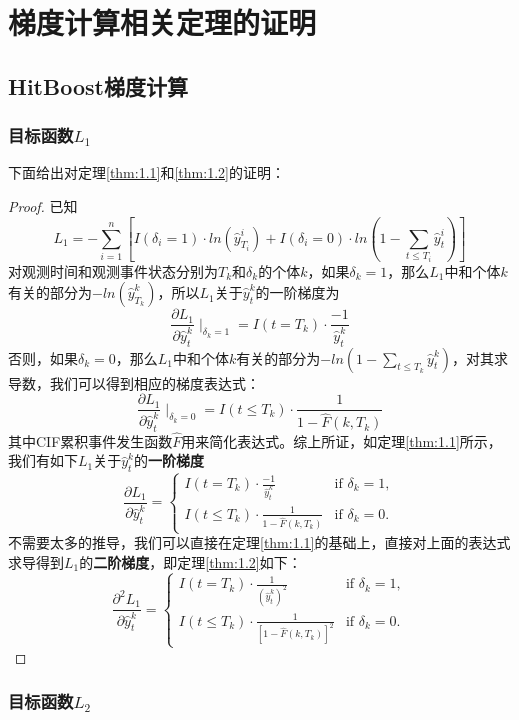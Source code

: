 
\thesisappendix

\chapter{梯度计算相关定理的证明}

\section{HitBoost梯度计算}

\subsection{目标函数$L_1$}

下面给出对定理\ref{thm:1.1}和\ref{thm:1.2}的证明：
\begin{proof}
已知$$L_1 = -\sum_{i=1}^{n} \left[ I(\delta_i=1)\cdot ln(\hat{y}_{T_i}^i) + I(\delta_i=0)\cdot ln(1-\sum_{t\le T_i}\hat{y}_t^i) \right]$$ 对观测时间和观测事件状态分别为$T_k$和$\delta_k$的个体$k$，如果$\delta_k = 1$，那么$L_1$中和个体$k$有关的部分为$-ln(\hat{y}_{T_k}^k)$，所以$L_1$关于$\hat{y}_t^k$的一阶梯度为$$\frac{\partial L_1}{\partial \hat{y}_t^k} \mid_{\delta_k = 1} = I(t=T_k)\cdot \frac{-1}{\hat{y}_t^k}$$ 否则，如果$\delta_k = 0$，那么$L_1$中和个体$k$有关的部分为$-ln(1-\sum_{t\le T_k}\hat{y}_t^k)$，对其求导数，我们可以得到相应的梯度表达式：$$\frac{\partial L_1}{\partial \hat{y}_t^k} \mid_{\delta_k = 0} = I(t\le T_k)\cdot \frac{1}{1-\hat{F}(k, T_k)}$$ 其中CIF累积事件发生函数$\hat{F}$用来简化表达式。综上所证，如定理\ref{thm:1.1}所示，我们有如下$L_1$关于$\hat{y}_t^k$的\textbf{一阶梯度}$$
\frac{\partial L_1}{\partial \hat{y}_t^k}=
\begin{cases}
  I(t=T_k)\cdot \frac{-1}{\hat{y}_t^k} & \text{if } \delta_k = 1,\\
  I(t\le T_k)\cdot \frac{1}{1-\hat{F}(k, T_k)} & \text{if } \delta_k = 0.
\end{cases}
$$ 不需要太多的推导，我们可以直接在定理\ref{thm:1.1}的基础上，直接对上面的表达式求导得到$L_1$的\textbf{二阶梯度}，即定理\ref{thm:1.2}如下：$$
\frac{\partial^2 L_1}{\partial \hat{y}_t^k}=
\begin{cases}
  I(t=T_k)\cdot \frac{1}{{(\hat{y}_t^k)}^2} & \text{if } \delta_k = 1,\\
  I(t\le T_k)\cdot \frac{1}{{[1-\hat{F}(k, T_k)]}^2} & \text{if } \delta_k = 0.
\end{cases}
$$
\end{proof}

\subsection{目标函数$L_2$}

